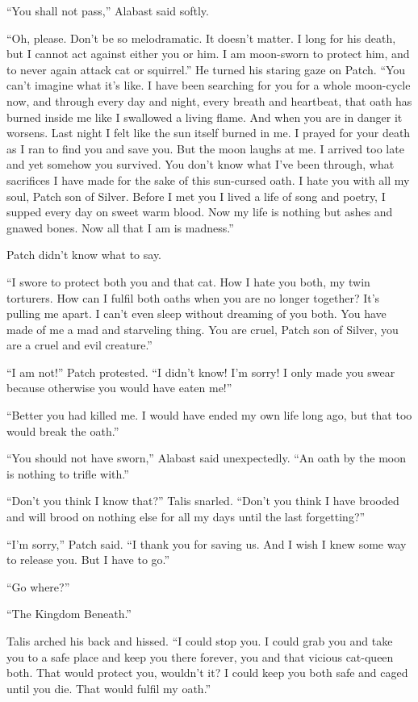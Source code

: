 \documentclass[ebook,oneside,openany,12pt]{memoir}
\begin{document}
“You shall not pass,” Alabast said softly.

“Oh, please. Don’t be so melodramatic. It doesn’t matter. I long for
his death, but I cannot act against either you or him. I am moon-sworn
to protect him, and to never again attack cat or squirrel.” He turned
his staring gaze on Patch. “You can’t imagine what it’s like. I have
been searching for you for a whole moon-cycle now, and through every
day and night, every breath and heartbeat, that oath has burned inside
me like I swallowed a living flame. And when you are in danger it
worsens. Last night I felt like the sun itself burned in me. I prayed
for your death as I ran to find you and save you. But the moon laughs
at me. I arrived too late and yet somehow you survived. You don’t know
what I’ve been through, what sacrifices I have made for the sake of
this sun-cursed oath. I hate you with all my soul, Patch son of
Silver. Before I met you I lived a life of song and poetry, I supped
every day on sweet warm blood. Now my life is nothing but ashes and
gnawed bones. Now all that I am is madness.”

Patch didn’t know what to say.

“I swore to protect both you and that cat. How I hate you both, my
twin torturers. How can I fulfil both oaths when you are no longer
together? It’s pulling me apart. I can’t even sleep without dreaming
of you both. You have made of me a mad and starveling thing. You are
cruel, Patch son of Silver, you are a cruel and evil creature.”

“I am not!” Patch protested. “I didn’t know! I’m sorry! I only made
you swear because otherwise you would have eaten me!”

“Better you had killed me. I would have ended my own life long ago,
but that too would break the oath.”

“You should not have sworn,” Alabast said unexpectedly. “An oath by
the moon is nothing to trifle with.”

“Don’t you think I know that?” Talis snarled. “Don’t you think I have
brooded and will brood on nothing else for all my days until the last
forgetting?”

“I’m sorry,” Patch said. “I thank you for saving us. And I wish I knew
some way to release you. But I have to go.”

“Go where?”

“The Kingdom Beneath.”

Talis arched his back and hissed. “I could stop you. I could grab you
and take you to a safe place and keep you there forever, you and that
vicious cat-queen both. That would protect you, wouldn’t it? I could
keep you both safe and caged until you die. That would fulfil my
oath.”
\end{document}
